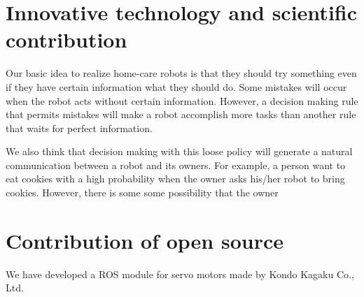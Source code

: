 \documentclass{llncs}
\begin{document}
\section{Innovative technology and scientific contribution}

Our basic idea to realize home-care robots is that they
should try something even if they have certain information
what they should do. Some mistakes will occur when the robot
acts without certain information.
However, a decision making rule that permits mistakes will make
a robot accomplish more tasks than another rule that waits for
perfect information.

We also think that decision making with this loose policy
will generate a natural communication between a robot and its owners.
For example, a person want to eat cookies
with a high probability when the owner asks his/her robot to bring cookies.
However, there is some some possibility that the owner

\section{Contribution of open source}

We have developed a ROS module for servo motors made by Kondo Kagaku Co., Ltd.




\end{document}
